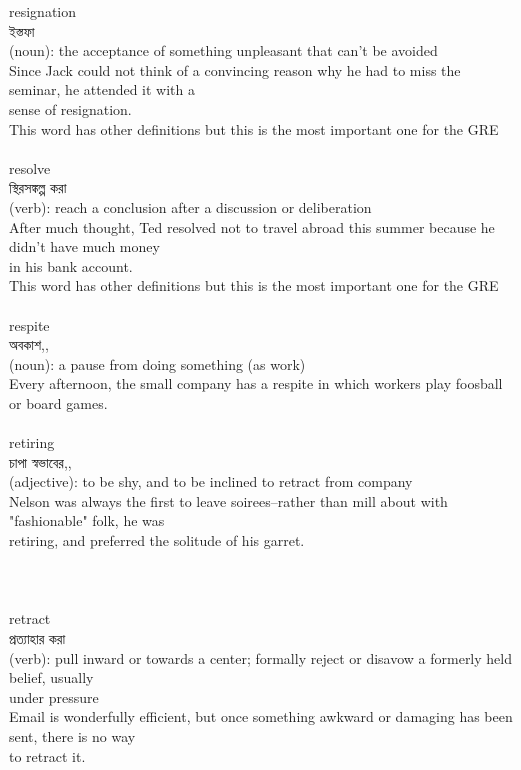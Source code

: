 \documentclass{article}
\begin{document}
{resignation}\\
{ইস্তফা}\\
{(noun): the acceptance of something unpleasant that can't be avoided\\Since Jack could not think of a convincing reason why he had to miss the seminar, he attended it with a\\sense of resignation.\\This word has other definitions but this is the most important one for the GRE\\}\\
{resolve}\\
{স্থিরসঙ্কল্প করা}\\
{(verb): reach a conclusion after a discussion or deliberation\\After much thought, Ted resolved not to travel abroad this summer because he didn't have much money\\in his bank account.\\This word has other definitions but this is the most important one for the GRE\\}\\
{respite}\\
{অবকাশ,,}\\
{(noun): a pause from doing something (as work)\\Every afternoon, the small company has a respite in which workers play foosball or board games.\\}\\
{retiring}\\
{চাপা স্বভাবের,,}\\
{(adjective): to be shy, and to be inclined to retract from company\\Nelson was always the first to leave soirees--rather than mill about with "fashionable" folk, he was\\retiring, and preferred the solitude of his garret.\\\\                                                                               \\}\\
{retract}\\
{প্রত্যাহার করা}\\
{(verb): pull inward or towards a center; formally reject or disavow a formerly held belief, usually\\under pressure\\Email is wonderfully efficient, but once something awkward or damaging has been sent, there is no way\\to retract it.\\}\\
\end{document}
